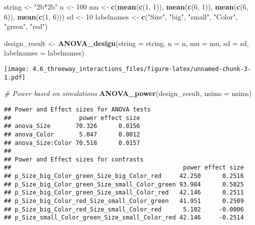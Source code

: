\documentclass[]{article}
\newenvironment{Shaded}{\begin{snugshade}}{\end{snugshade}}
\newcommand{\KeywordTok}[1]{\textcolor[rgb]{0.13,0.29,0.53}{\textbf{#1}}}
\newcommand{\DataTypeTok}[1]{\textcolor[rgb]{0.13,0.29,0.53}{#1}}
\newcommand{\DecValTok}[1]{\textcolor[rgb]{0.00,0.00,0.81}{#1}}
\newcommand{\StringTok}[1]{\textcolor[rgb]{0.31,0.60,0.02}{#1}}
\newcommand{\CommentTok}[1]{\textcolor[rgb]{0.56,0.35,0.01}{\textit{#1}}}
\newcommand{\NormalTok}[1]{#1}
\begin{document}
\begin{Shaded}
\begin{Highlighting}[]
\NormalTok{string <-}\StringTok{ "2b*2b"}
\NormalTok{n <-}\StringTok{ }\DecValTok{100}
\NormalTok{mu <-}\StringTok{ }\KeywordTok{c}\NormalTok{(}\KeywordTok{mean}\NormalTok{(}\KeywordTok{c}\NormalTok{(}\DecValTok{1}\NormalTok{, }\DecValTok{1}\NormalTok{)), }\KeywordTok{mean}\NormalTok{(}\KeywordTok{c}\NormalTok{(}\DecValTok{6}\NormalTok{, }\DecValTok{1}\NormalTok{)), }\KeywordTok{mean}\NormalTok{(}\KeywordTok{c}\NormalTok{(}\DecValTok{6}\NormalTok{, }\DecValTok{6}\NormalTok{)), }\KeywordTok{mean}\NormalTok{(}\KeywordTok{c}\NormalTok{(}\DecValTok{1}\NormalTok{, }\DecValTok{6}\NormalTok{)))}
\NormalTok{sd <-}\StringTok{ }\DecValTok{10}
\NormalTok{labelnames <-}\StringTok{ }\KeywordTok{c}\NormalTok{(}\StringTok{"Size"}\NormalTok{, }\StringTok{"big"}\NormalTok{, }\StringTok{"small"}\NormalTok{, }\StringTok{"Color"}\NormalTok{, }\StringTok{"green"}\NormalTok{, }\StringTok{"red"}\NormalTok{)}

\NormalTok{design_result <-}\StringTok{ }\KeywordTok{ANOVA_design}\NormalTok{(}\DataTypeTok{string =}\NormalTok{ string,}
                   \DataTypeTok{n =}\NormalTok{ n, }
                   \DataTypeTok{mu =}\NormalTok{ mu, }
                   \DataTypeTok{sd =}\NormalTok{ sd, }
                   \DataTypeTok{labelnames =}\NormalTok{ labelnames)}
\end{Highlighting}
\end{Shaded}

\texttt{[image: 4.6\_threeway\_interactions\_files/figure-latex/unnamed-chunk-3-1.pdf]}

\begin{Shaded}
\begin{Highlighting}[]
\CommentTok{# Power based on simulations}
\KeywordTok{ANOVA_power}\NormalTok{(design_result, }\DataTypeTok{nsims =}\NormalTok{ nsims)}
\end{Highlighting}
\end{Shaded}

\begin{verbatim}
## Power and Effect sizes for ANOVA tests
##                   power effect size
## anova_Size       70.326      0.0156
## anova_Color       5.047      0.0012
## anova_Size:Color 70.518      0.0157
## 
## Power and Effect sizes for contrasts
##                                                power effect size
## p_Size_big_Color_green_Size_big_Color_red     42.250      0.2516
## p_Size_big_Color_green_Size_small_Color_green 93.984      0.5025
## p_Size_big_Color_green_Size_small_Color_red   42.146      0.2511
## p_Size_big_Color_red_Size_small_Color_green   41.951      0.2509
## p_Size_big_Color_red_Size_small_Color_red      5.102     -0.0006
## p_Size_small_Color_green_Size_small_Color_red 42.146     -0.2514
\end{verbatim}
\end{document}
